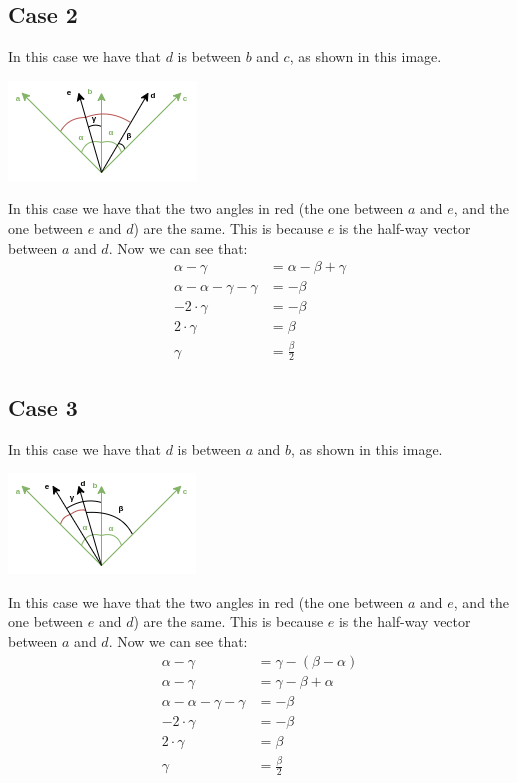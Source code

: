 \documentclass{article}
\begin{document}
\subsection*{Case 2}
In this case we have that $d$ is between $b$ and $c$, as shown in this image. \\
\begin{center}
  \includegraphics{./diagram_2.png}
\end{center}
In this case we have that the two angles in red (the one between $a$ and $e$, and the one between $e$ and $d$) are the same. This is because $e$ is the half-way vector between $a$ and $d$. Now we can see that:
\begin{align*}
  \alpha - \gamma & = \alpha - \beta + \gamma \\
  \alpha - \alpha - \gamma - \gamma & = - \beta \\
  -2 \cdot \gamma & = - \beta \\
  2 \cdot \gamma & = \beta \\
  \gamma & = \displaystyle\frac{\beta}{2} 
\end{align*}

\subsection*{Case 3}
In this case we have that $d$ is between $a$ and $b$, as shown in this image. \\
\begin{center}
  \includegraphics{./diagram_3.png}
\end{center}
In this case we have that the two angles in red (the one between $a$ and $e$, and the one between $e$ and $d$) are the same. This is because $e$ is the half-way vector between $a$ and $d$. Now we can see that:
\begin{align*}
  \alpha - \gamma & = \gamma - (\beta - \alpha) \\
  \alpha - \gamma & = \gamma - \beta + \alpha \\
  \alpha - \alpha - \gamma - \gamma & = - \beta \\
  - 2 \cdot \gamma & = - \beta \\
  2 \cdot \gamma & = \beta \\
  \gamma & = \displaystyle\frac{\beta}{2}
\end{align*}
\end{document}
